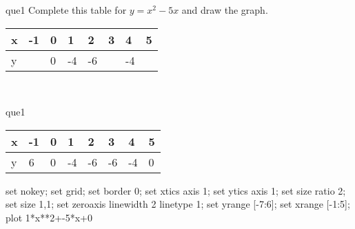 \documentclass[13.5pt, varwidth=true]{beamer}
\begin{document}
\begin{frame}[shrink=19,fragile]
	\begin{beamercolorbox}[rounded=true, left, shadow=true,wd=14.8cm]{que1}
		 Complete this table for $y = x^{2} - 5x$ and draw the graph. \\[0.3cm] \renewcommand{\arraystretch}{1.2}\begin{tabular}{|C|C|C|C|C|C|C|C|} \hline x & -1 & 0 & 1 & 2 & 3 & 4 & 5 \\ \hline y &  & 0 & -4 & -6 &  & -4 & \\ \hline \end{tabular}\\[0.3cm]
	\end{beamercolorbox}
\end{frame}
\begin{frame}[shrink=19,fragile]
	\begin{beamercolorbox}[rounded=true, left, shadow=true,wd=14.8cm]{que1}
		\renewcommand{\arraystretch}{1.2}\begin{tabular}{|C|C|C|C|C|C|C|C|} \hline x & -1 & 0 & 1 & 2 & 3 & 4 & 5 \\ \hline y & 6 & 0 & -4 & -6 & -6 & -4 & 0\\ \hline \end{tabular}\begin{gnuplot}[terminal=pdf] set nokey; set grid; set border 0; set xtics axis 1; set ytics axis 1; set size ratio 2; set size 1,1; set zeroaxis linewidth 2 linetype 1; set yrange [-7:6]; set xrange [-1:5]; plot 1*x**2+-5*x+0 \end{gnuplot}
	\end{beamercolorbox}
\end{frame}
\end{document}
